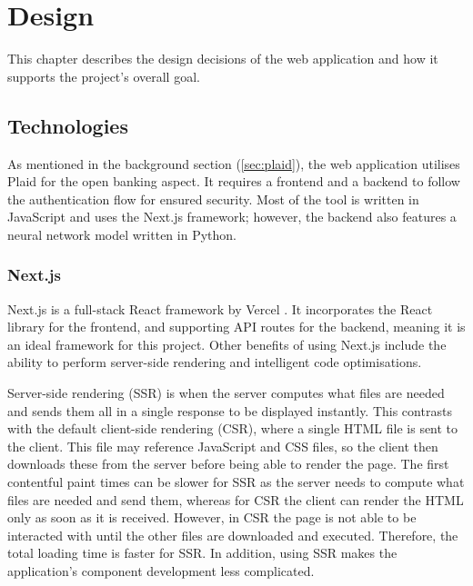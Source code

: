 \chapter{Design}
\label{ch:design}

This chapter describes the design decisions of the web application and how it supports the project's overall goal.

\section{Technologies}
\label{sec:technologies}
As mentioned in the background section (\ref{sec:plaid}), the web application utilises Plaid for the open banking aspect. It requires a frontend and a backend to follow the authentication flow for ensured security. Most of the tool is written in JavaScript and uses the Next.js framework; however, the backend also features a neural network model written in Python.

\subsection{Next.js}
Next.js is a full-stack React framework by Vercel \cite{Next.js}. It incorporates the React library for the frontend, and supporting API routes for the backend, meaning it is an ideal framework for this project. Other benefits of using Next.js include the ability to perform server-side rendering and intelligent code optimisations.

Server-side rendering (SSR) is when the server computes what files are needed and sends them all in a single response to be displayed instantly. This contrasts with the default client-side rendering (CSR), where a single HTML file is sent to the client. This file may reference JavaScript and CSS files, so the client then downloads these from the server before being able to render the page. The first contentful paint times can be slower for SSR as the server needs to compute what files are needed and send them, whereas for CSR the client can render the HTML only as soon as it is received. However, in CSR the page is not able to be interacted with until the other files are downloaded and executed. Therefore, the total loading time is faster for SSR. In addition, using SSR makes the application's component development less complicated.

